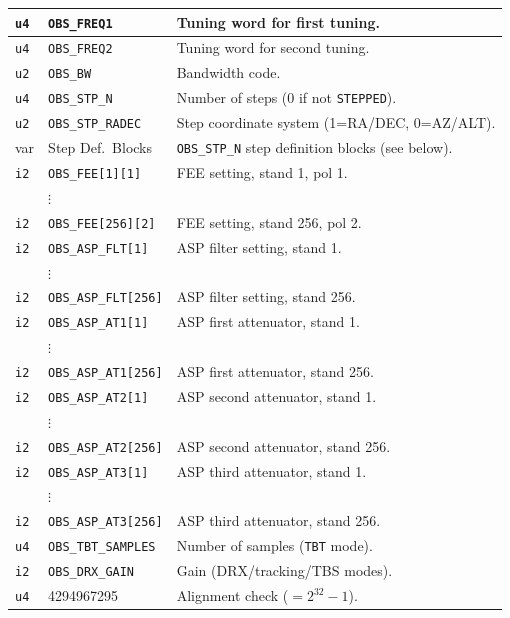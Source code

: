 \begin{longtable}{|l|l|p{8cm}|}
\texttt{u4} & \texttt{OBS\_FREQ1}           & Tuning word for first tuning. \\
\hline
\texttt{u4} & \texttt{OBS\_FREQ2}           & Tuning word for second tuning. \\
\hline
\texttt{u2} & \texttt{OBS\_BW}              & Bandwidth code. \\
\hline
\texttt{u4} & \texttt{OBS\_STP\_N}          & Number of steps (0 if not \texttt{STEPPED}). \\
\hline
\texttt{u2} & \texttt{OBS\_STP\_RADEC}      & Step coordinate system (1=RA/DEC, 0=AZ/ALT). \\
\hline
     var     & Step Def.\ Blocks             & \texttt{OBS\_STP\_N} step definition blocks (see below). \\
\hline
\texttt{i2} & \texttt{OBS\_FEE[1][1]}       & FEE setting, stand 1, pol 1. \\
\hline
             & $\vdots$                      & \\
\hline
\texttt{i2} & \texttt{OBS\_FEE[256][2]}     & FEE setting, stand 256, pol 2. \\
\hline
\texttt{i2} & \texttt{OBS\_ASP\_FLT[1]}     & ASP filter setting, stand 1. \\
\hline
             & $\vdots$                      & \\
\hline
\texttt{i2} & \texttt{OBS\_ASP\_FLT[256]}   & ASP filter setting, stand 256. \\
\hline
\texttt{i2} & \texttt{OBS\_ASP\_AT1[1]}     & ASP first attenuator, stand 1. \\
\hline
             & $\vdots$                      & \\
\hline
\texttt{i2} & \texttt{OBS\_ASP\_AT1[256]}   & ASP first attenuator, stand 256. \\
\hline
\texttt{i2} & \texttt{OBS\_ASP\_AT2[1]}     & ASP second attenuator, stand 1. \\
\hline
             & $\vdots$                      & \\
\hline
\texttt{i2} & \texttt{OBS\_ASP\_AT2[256]}   & ASP second attenuator, stand 256. \\
\hline
\texttt{i2} & \texttt{OBS\_ASP\_AT3[1]}     & ASP third attenuator, stand 1. \\
\hline
             & $\vdots$                      & \\
\hline
\texttt{i2} & \texttt{OBS\_ASP\_AT3[256]}   & ASP third attenuator, stand 256. \\
\hline
\texttt{u4} & \texttt{OBS\_TBT\_SAMPLES}    & Number of samples (\texttt{TBT} mode). \\
\hline
\texttt{i2} & \texttt{OBS\_DRX\_GAIN}       & Gain (DRX/tracking/TBS modes). \\
\hline
\texttt{u4} & 4294967295                     & Alignment check ($= 2^{32}-1$). \\
\hline

\end{longtable}

